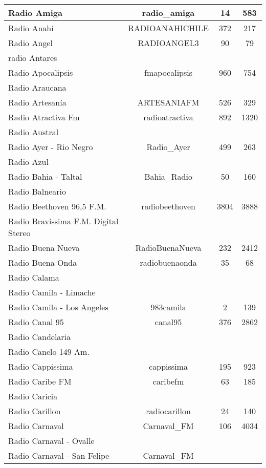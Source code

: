 \begin{center}
\begin{longtable}{| l | c | c | c |}
Radio Amiga	&	radio\_amiga	&	14	&	583	\\ \hline
Radio Anahí	&	RADIOANAHICHILE	&	372	&	217	\\ \hline
Radio Angel	&	RADIOANGEL3	&	90	&	79	\\ \hline
radio Antares	&		&		&		\\ \hline
Radio Apocalipsis	&	fmapocalipsis	&	960	&	754	\\ \hline
Radio Araucana	&		&		&		\\ \hline
Radio Artesanía	&	ARTESANIAFM	&	526	&	329	\\ \hline
Radio Atractiva Fm	&	radioatractiva	&	892	&	1320	\\ \hline
Radio Austral	&		&		&		\\ \hline
Radio Ayer - Rio Negro	&	Radio\_Ayer	&	499	&	263	\\ \hline
Radio Azul	&		&		&		\\ \hline
Radio Bahia - Taltal	&	Bahia\_Radio	&	50	&	160	\\ \hline
Radio Balneario	&		&		&		\\ \hline
Radio Beethoven 96,5 F.M.	&	radiobeethoven	&	3804	&	3888	\\ \hline
Radio Bravissima F.M. Digital Stereo	&		&		&		\\ \hline
Radio Buena Nueva	&	RadioBuenaNueva	&	232	&	2412	\\ \hline
Radio Buena Onda	&	radiobuenaonda	&	35	&	68	\\ \hline
Radio Calama	&		&		&		\\ \hline
Radio Camila - Limache	&		&		&		\\ \hline
Radio Camila - Los Angeles	&	983camila	&	2	&	139	\\ \hline
Radio Canal 95	&	canal95	&	376	&	2862	\\ \hline
Radio Candelaria	&		&		&		\\ \hline
Radio Canelo 149 Am.	&		&		&		\\ \hline
Radio Cappissima	&	cappissima	&	195	&	923	\\ \hline
Radio Caribe FM	&	caribefm	&	63	&	185	\\ \hline
Radio Caricia	&		&		&		\\ \hline
Radio Carillon	&	radiocarillon	&	24	&	140	\\ \hline
Radio Carnaval	&	Carnaval\_FM	&	106	&	4034	\\ \hline
Radio Carnaval - Ovalle	&		&		&		\\ \hline
Radio Carnaval - San Felipe	&	Carnaval\_FM	&		&		\\ \hline

\end{longtable}
\end{center}
